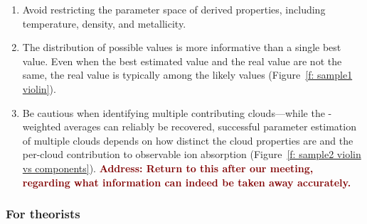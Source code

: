 \documentclass[fleqn,usenatbib]{mnras}
\newcommand{\todo}[1]{\textcolor{Maroon}{\textbf{Address: #1}}}
\begin{document}
\begin{enumerate}
    \item Avoid restricting the parameter space of derived properties, including temperature, density, and metallicity. 
    \item The distribution of possible values is more informative than a single best value. Even when the best estimated value and the real value are not the same, the real value is typically among the likely values (Figure~\ref{f: sample1 violin}).
    \item Be cautious when identifying multiple contributing clouds---while the -weighted averages can reliably be recovered, successful parameter estimation of multiple clouds depends on how distinct the cloud properties are and the per-cloud contribution to observable ion absorption (Figure~\ref{f: sample2 violin vs components}).
    \todo{Return to this after our meeting, regarding what information can indeed be taken away accurately.}
\end{enumerate}

\subsubsection{For theorists}
\end{document}
